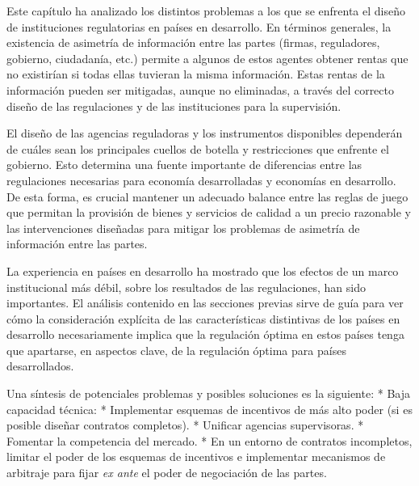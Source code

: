 \documentclass[
  12pt,
  spanish,
]{book}
\begin{document}
Este capítulo ha analizado los distintos problemas a los que se enfrenta
el diseño de instituciones regulatorias en países en desarrollo. En
términos generales, la existencia de asimetría de información entre las
partes (firmas, reguladores, gobierno, ciudadanía, etc.) permite a
algunos de estos agentes obtener rentas que no existirían si todas ellas
tuvieran la misma información. Estas rentas de la información pueden ser
mitigadas, aunque no eliminadas, a través del correcto diseño de las
regulaciones y de las instituciones para la supervisión.

El diseño de las agencias reguladoras y los instrumentos disponibles
dependerán de cuáles sean los principales cuellos de botella y
restricciones que enfrente el gobierno. Esto determina una fuente
importante de diferencias entre las regulaciones necesarias para
economía desarrolladas y economías en desarrollo. De esta forma, es
crucial mantener un adecuado balance entre las reglas de juego que
permitan la provisión de bienes y servicios de calidad a un precio
razonable y las intervenciones diseñadas para mitigar los problemas de
asimetría de información entre las partes.

La experiencia en países en desarrollo ha mostrado que los efectos de un
marco institucional más débil, sobre los resultados de las regulaciones,
han sido importantes. El análisis contenido en las secciones previas
sirve de guía para ver cómo la consideración explícita de las
características distintivas de los países en desarrollo necesariamente
implica que la regulación óptima en estos países tenga que apartarse, en
aspectos clave, de la regulación óptima para países desarrollados.

Una síntesis de potenciales problemas y posibles soluciones es la
siguiente: * Baja capacidad técnica: * Implementar esquemas de
incentivos de más alto poder (si es posible diseñar contratos
completos). * Unificar agencias supervisoras. * Fomentar la competencia
del mercado. * En un entorno de contratos incompletos, limitar el poder
de los esquemas de incentivos e implementar mecanismos de arbitraje para
fijar \emph{ex ante} el poder de negociación de las partes.
\end{document}
